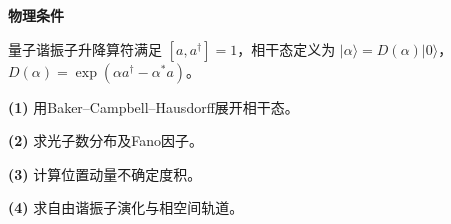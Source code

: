 \textbf{物理条件}\par 量子谐振子升降算符满足 \([a,a^\dagger]=1\)，相干态定义为 \(|\alpha\rangle=D(\alpha)|0\rangle\)，\(D(\alpha)=\exp(\alpha a^\dagger-\alpha^*a)\)。
\par\noindent\textbf{(1)} 用Baker–Campbell–Hausdorff展开相干态。
\par\noindent\textbf{(2)} 求光子数分布及Fano因子。
\par\noindent\textbf{(3)} 计算位置动量不确定度积。
\par\noindent\textbf{(4)} 求自由谐振子演化与相空间轨道。
